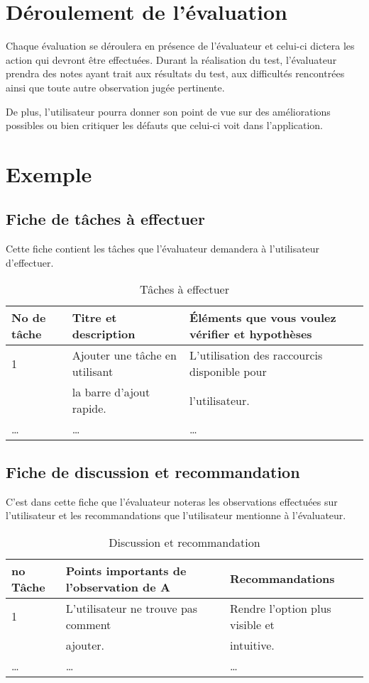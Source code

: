 \documentclass[letterpaper, oneside, 12pt,these,creativecommons]{thETS}
\begin{document}
\section{Déroulement de l'évaluation}

Chaque évaluation se déroulera en présence de l'évaluateur et celui-ci dictera les action qui devront être effectuées. Durant la réalisation du test, l'évaluateur prendra des notes ayant trait aux résultats du test, aux difficultés rencontrées ainsi que toute autre observation jugée pertinente.

De plus, l'utilisateur pourra donner son point de vue sur des améliorations possibles ou bien critiquer les défauts que celui-ci voit dans l'application.

\section{Exemple}

\subsection{Fiche de tâches à effectuer}

Cette fiche contient les tâches que l'évaluateur demandera à l'utilisateur d'effectuer.

\begin{table}[H]
\centering
\begin{tabular}{|l|l|l|}
	\hline
	No de tâche & Titre et description & Éléments que vous voulez vérifier et hypothèses \\ \hline
	1 & Ajouter une tâche en utilisant & L'utilisation des raccourcis disponible pour \\
	   & la barre d'ajout rapide. &  l'utilisateur. \\ \hline
	\dots & \dots & \dots \\ \hline
\end{tabular}
\caption{Tâches à effectuer}
\end{table}

\newpage

\subsection{Fiche de discussion et recommandation}

C'est dans cette fiche que l'évaluateur noteras les observations effectuées sur l'utilisateur et les recommandations que l'utilisateur mentionne à l'évaluateur.

\begin{table}[H]
\centering
\begin{tabular}{|l|l|l|}
	\hline
	no Tâche & Points importants de l’observation de A & Recommandations \\ \hline
	1 & L'utilisateur ne trouve pas comment & Rendre l'option plus visible et \\
	   & ajouter. & intuitive. \\ \hline
	\dots & \dots & \dots \\ \hline
\end{tabular}
\caption{Discussion et recommandation}
\end{table}
\end{document}
